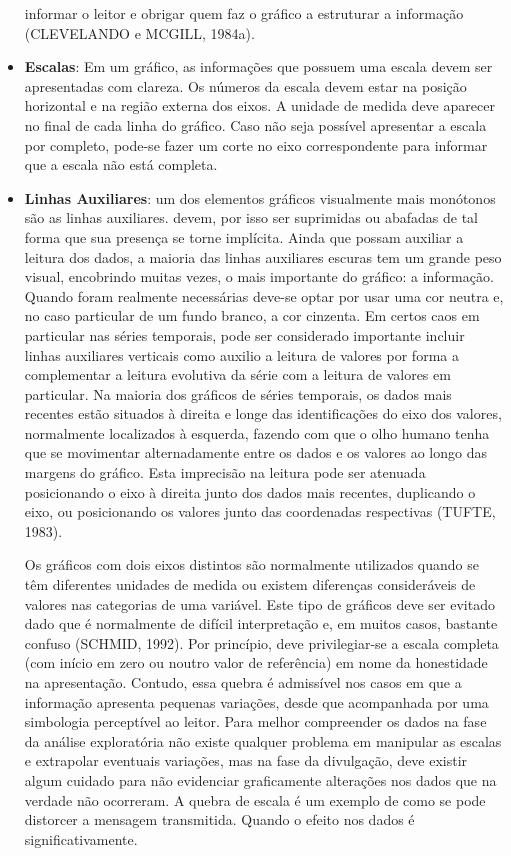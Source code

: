 \begin{itemize}
informar o leitor e obrigar quem faz o gráfico a estruturar a informação (CLEVELANDO e MCGILL, 1984a).\vskip0.3cm

\item \textbf{Escalas}: Em um gráfico, as informações que possuem uma escala devem ser apresentadas com clareza. Os números da escala devem estar na posição horizontal e na região
externa dos eixos. A unidade de medida deve aparecer no final de cada linha do gráfico. Caso não seja possível apresentar a escala por completo, pode-se fazer um corte no eixo correspondente para informar que a escala não está completa.

\item \textbf{Linhas Auxiliares}: um dos elementos gráficos visualmente mais monótonos são as linhas auxiliares. devem, por isso ser suprimidas ou abafadas de tal forma que sua presença se torne implícita. Ainda que possam auxiliar a leitura dos dados, a maioria das linhas auxiliares escuras tem um grande peso visual, encobrindo muitas vezes, o mais importante do gráfico: a informação. Quando foram realmente necessárias deve-se optar por usar uma cor neutra e, no caso particular de um fundo branco, a cor cinzenta. Em certos caos em particular nas séries temporais, pode ser considerado importante incluir linhas auxiliares verticais como auxilio a leitura de valores por forma a complementar a leitura evolutiva da série com a leitura de valores em particular. Na maioria dos gráficos de séries temporais, os dados mais recentes estão situados à direita e longe das identificações do eixo dos valores, normalmente localizados à esquerda, fazendo com que o olho humano tenha que se movimentar alternadamente entre os dados e os valores ao longo das margens do gráfico. Esta imprecisão na leitura pode ser atenuada posicionando o eixo à direita junto dos dados mais recentes, duplicando o eixo, ou posicionando os valores junto das coordenadas respectivas (TUFTE, 1983).\vskip0.3cm

\newpage

\inic Os gráficos com dois eixos distintos são normalmente utilizados quando se têm diferentes unidades de medida ou existem diferenças consideráveis de valores nas categorias de uma variável. Este tipo de gráficos deve ser evitado dado que é normalmente de difícil interpretação e, em muitos casos, bastante confuso (SCHMID, 1992). Por princípio, deve privilegiar-se a escala completa (com início em zero ou noutro valor de referência) em nome da honestidade na apresentação. Contudo, essa quebra é admissível nos casos em que a informação apresenta pequenas variações, desde que acompanhada por uma simbologia perceptível ao leitor. Para melhor compreender os dados na fase da análise exploratória não existe qualquer problema em manipular as escalas e extrapolar eventuais variações, mas na fase da divulgação, deve existir algum cuidado para não evidenciar graficamente alterações nos dados que na verdade não ocorreram. A quebra de escala é um exemplo de como se pode distorcer a mensagem transmitida. Quando o efeito nos dados é significativamente. 
\end{itemize}



